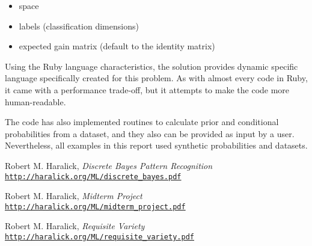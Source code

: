 \documentclass[letterpaper, conference]{IEEEtran}
\begin{document}
\begin{itemize}
  \item space
  \item labels (classification dimensions)
  \item expected gain matrix (default to the identity matrix)
\end{itemize}

Using the Ruby language characteristics, the solution provides dynamic specific language specifically created for this problem. As with almost every code in Ruby, it came with a performance trade-off, but it attempts to make the code more human-readable.

The code has also implemented routines to calculate prior and conditional probabilities from a dataset, and they also can be provided as input by a user. Nevertheless, all examples in this report used synthetic probabilities and datasets.

\begin{thebibliography}{2}

Robert M. Haralick,
\textit{Discrete Bayes Pattern Recognition}
\\\texttt{\url{http://haralick.org/ML/discrete_bayes.pdf}}

Robert M. Haralick,
\textit{Midterm Project}
\\\texttt{\url{http://haralick.org/ML/midterm_project.pdf}}

Robert M. Haralick,
\textit{Requisite Variety}
\\\texttt{\url{http://haralick.org/ML/requisite_variety.pdf}}

\end{thebibliography}
\end{document}
